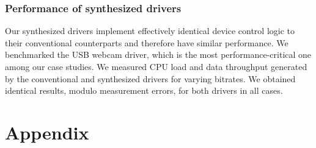 \documentclass[a4paper,twoside,openright,11pt]{book}
\theoremstyle{definition}
\begin{document}
\subsection{Performance of synthesized drivers} 
Our synthesized drivers implement effectively identical device control logic to their conventional counterparts and therefore have similar performance.  We benchmarked the USB webcam driver, which is the most performance-critical one among our case studies.  We measured CPU load and data throughput generated by the conventional and synthesized drivers for varying bitrates.  We obtained identical results, modulo measurement errors, for both drivers in all cases.

\chapter{Appendix}
\end{document}

